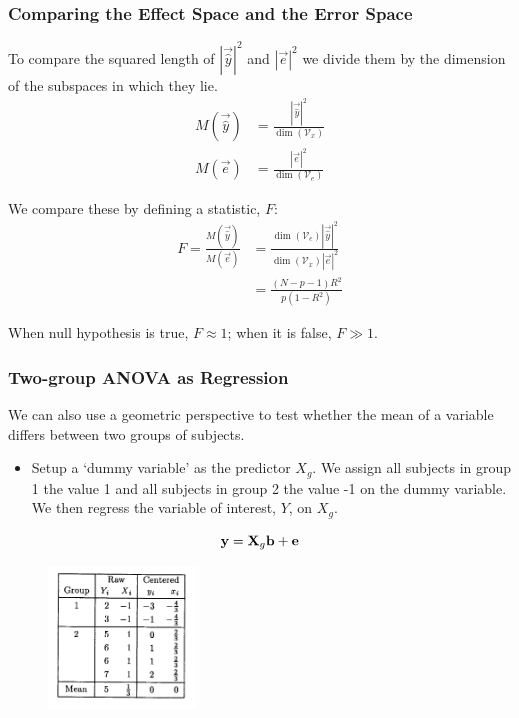 \documentclass{beamer}
\begin{document}
\begin{frame}
  \frametitle{Comparing the Effect Space and the Error Space}

To compare the squared length of $|\vec{\hat{y}}|^2$ and $|\vec{e}|^2$ we divide them by the dimension of the subspaces in which they lie.
\begin{align*}
M(\vec{\hat{y}}) &= \frac{|\vec{\hat{y}}|^2} {\dim(\mathcal{V}_x)}   \\
M(\vec{e})       &= \frac{|\vec{e}|^2}{\dim(\mathcal{V}_e)}
\end{align*}

We compare these by defining a statistic, $F$:
\begin{align*}
  F = \frac{M(\vec{\hat{y}})}{M(\vec{e})} &= \frac{\dim(\mathcal{V}_e)|\vec{\hat{y}}|^2}
                                                  {\dim(\mathcal{V}_x)|\vec{e}|^2}\\
 &= \frac{(N-p-1)R^2}{p(1-R^2)}
\end{align*}

\alert{When null hypothesis is true, $F\approx 1$; when it is false, $F \gg 1$.}

\end{frame}



\begin{frame}
  \frametitle{Two-group ANOVA as Regression}

We can also use a geometric perspective to test whether the mean of a variable differs between two groups of subjects.

\begin{itemize}
\item Setup a `dummy variable' as the predictor $X_g$.   We assign all subjects in group 1 the value 1 and all subjects in group 2 the value -1 on the dummy variable.  We then regress the variable of interest, $Y$, on $X_g$.

\end{itemize}
%
$$
\mathbf{y} = \mathbf{X}_g\mathbf{b} + \mathbf{e}
$$
%
\begin{figure}
{\centering \includegraphics[height=1.5in]{anova-2group-table.pdf}}
\end{figure}


\end{frame}
\end{document}
